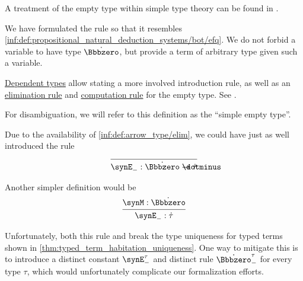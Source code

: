 \begin{comments}
  \item A treatment of the empty type within simple type theory can be found in \cite[\S 4.3.4]{Mimram2020ProgramEqualsProof}.

  \item We have formulated the rule so that it resembles \ref{inf:def:propositional_natural_deduction_systems/bot/efq}. We do not forbid a variable to have type \( \syn\Bbbzero \), but provide a term of arbitrary type given such a variable.

  \item \hyperref[con:dependent_type]{Dependent types} allow stating a more involved introduction rule, as well as an \hyperref[rem:type_theory_rule_classification/intro]{elimination rule} and \hyperref[rem:type_theory_rule_classification/equality/comp]{computation rule} for the empty type. See .

  For disambiguation, we will refer to this definition as the \enquote{simple empty type}.

  \item Due to the availability of \ref{inf:def:arrow_type/elim}, we could have just as well introduced the rule
  \begin{equation*}
    \begin{prooftree}
      \infer0{ \synE_-: \syn\Bbbzero \synimplies \syn\tau }
    \end{prooftree}
  \end{equation*}

  Another simpler definition would be
  \begin{equation*}
    \begin{prooftree}
      \hypo{ \synM: \syn\Bbbzero }
      \infer1{ \synE_-: \syn\tau }
    \end{prooftree}
  \end{equation*}

  Unfortunately, both this rule and break the type uniqueness for typed terms shown in \cref{thm:typed_term_habitation_uniqueness}. One way to mitigate this is to introduce a distinct constant \( \synE_-^\tau \) and distinct rule \( \syn\Bbbzero_-^\tau \) for every type \( \tau \), which would unfortunately complicate our formalization efforts.
\end{comments}

